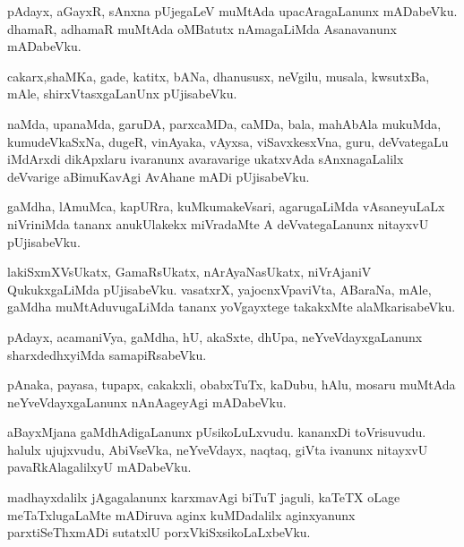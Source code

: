 \documentclass{article}
\begin{document}
\begin{mn}%
pAdayx, aGayxR, sAnxna pUjegaLeV muMtAda upacAragaLanunx mADabeVku. dhamaR, adhamaR 
muMtAda oMBatutx nAmagaLiMda Asanavanunx mADabeVku.
\end{mn}

\begin{mn}%
cakarx,shaMKa, gade, katitx, bANa, dhanususx, neVgilu, musala, kwsutxBa, mAle, 
shirxVtasxgaLanUnx pUjisabeVku.
\end{mn}

\begin{mn}%
naMda, upanaMda, garuDA, parxcaMDa, caMDa, bala, mahAbAla mukuMda, kumudeVkaSxNa, dugeR, 
vinAyaka, vAyxsa, viSavxkesxVna, guru, deVvategaLu iMdArxdi dikApxlaru ivaranunx 
avaravarige ukatxvAda sAnxnagaLalilx deVvarige aBimuKavAgi AvAhane mADi pUjisabeVku.
\end{mn}

\begin{mn}%
gaMdha, lAmuMca, kapURra, kuMkumakeVsari, agarugaLiMda vAsaneyuLaLx niVriniMda tananx 
anukUlakekx miVradaMte A deVvategaLanunx nitayxvU pUjisabeVku.
\end{mn}

\begin{mn}%
lakiSxmXVsUkatx, GamaRsUkatx, nArAyaNasUkatx, niVrAjaniV QukukxgaLiMda pUjisabeVku. 
vasatxrX, yajocnxVpaviVta, ABaraNa, mAle, gaMdha muMtAduvugaLiMda tananx yoVgayxtege 
takakxMte alaMkarisabeVku.
\end{mn}

\begin{mn}%
pAdayx, acamaniVya, gaMdha, hU, akaSxte, dhUpa, neYveVdayxgaLanunx sharxdedhxyiMda 
samapiRsabeVku.
\end{mn}

\begin{mn}%
pAnaka, payasa, tupapx, cakakxli, obabxTuTx, kaDubu, hAlu, mosaru muMtAda neYveVdayxgaLanunx 
nAnAageyAgi mADabeVku.
\end{mn}

\begin{mn}%
aBayxMjana gaMdhAdigaLanunx pUsikoLuLxvudu. kananxDi toVrisuvudu. halulx ujujxvudu, 
AbiVseVka, neYveVdayx, naqtaq, giVta ivanunx nitayxvU pavaRkAlagalilxyU mADabeVku.
\end{mn}

\begin{mn}%
madhayxdalilx jAgagalanunx karxmavAgi biTuT jaguli, kaTeTX oLage meTaTxlugaLaMte mADiruva 
aginx kuMDadalilx aginxyanunx parxtiSeThxmADi sutatxlU porxVkiSxsikoLaLxbeVku.
\end{mn}
\end{document}
